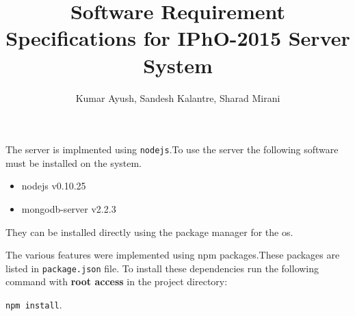 \documentclass[a4paper,10pt]{article}
\title{Software Requirement Specifications for IPhO-2015 Server System}
\author{Kumar Ayush, Sandesh Kalantre, Sharad Mirani}
\date{}
\begin{document}
\maketitle
The server is implmented using \texttt{nodejs}.To use the server the following software must be installed
on the system.
\begin{itemize}
 \item nodejs v0.10.25
 \item mongodb-server v2.2.3 
\end{itemize}
They can be installed directly using the package manager for the os.


The various features were implemented using npm packages.These packages are listed in \texttt{package.json} file.
To install these dependencies run the following command with \textbf{root access} in the project directory:

\texttt{npm install}.
\end{document}
